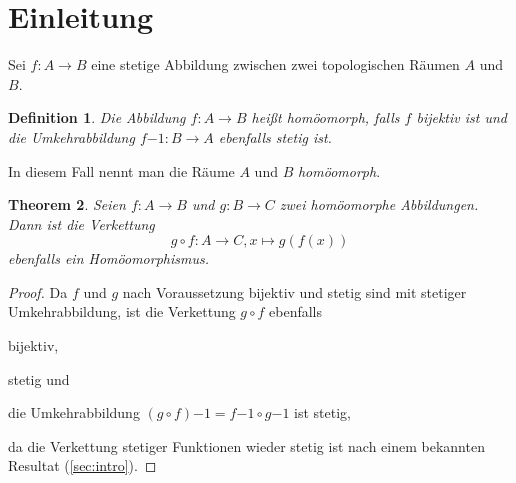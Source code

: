 \documentclass{article}
\newtheorem{theorem}{Theorem}
\newtheorem{definition}[theorem]{Definition}
\begin{document}
\section{Einleitung}
\label{sec:intro}

Sei $f: A \to B$ eine stetige Abbildung zwischen zwei topologischen Räumen $A$ und $B$.

\begin{definition}
Die Abbildung $f: A \to B$ heißt \emph{homöomorph}, falls $f$ bijektiv ist und die Umkehrabbildung $f{-1}: B \to A$ ebenfalls stetig ist.
\end{definition}

In diesem Fall nennt man die Räume $A$ und $B$ \emph{homöomorph}.

\begin{theorem}
Seien $f: A \to B$ und $g: B \to C$ zwei homöomorphe Abbildungen.
Dann ist die Verkettung 
\[
	g \circ f: A \to C, x \mapsto g(f(x))
\]
ebenfalls ein Homöomorphismus.
\label{th:composition}
\end{theorem}

\begin{proof}
Da $f$ und $g$ nach Voraussetzung bijektiv und stetig sind mit stetiger Umkehrabbildung, ist die Verkettung $g \circ f$ ebenfalls
\begin{enumerate*}[label=(\roman*)]
\item bijektiv,
\item stetig und
\item die Umkehrabbildung $(g \circ f){-1} = f{-1} \circ g{-1}$ ist stetig,
\end{enumerate*}
da die Verkettung stetiger Funktionen wieder stetig ist nach einem bekannten Resultat (\autoref{sec:intro}).
\end{proof}
\end{document}
